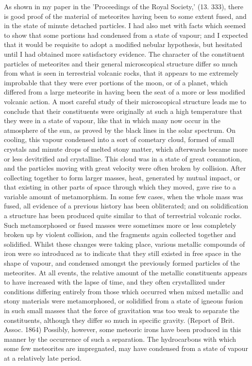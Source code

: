 \documentclass[a4paper, 12pt, oneside]{article}
\begin{document}
As shown in my paper in the 'Proceedings of the Royal Society,' (13. 333), there is good proof of the material of meteorites having been to some extent fused, and in the state of minute detached particles. I had also met with facts which seemed to show that some portions had condensed from a state of vapour; and I expected that it would be requisite to adopt a modified nebular hypothesis, but hesitated until I had obtained more satisfactory evidence. The character of the constituent particles of meteorites and their general microscopical structure differ so much from what is seen in terrestrial volcanic rocks, that it appears to me extremely improbable that they were ever portions of the moon, or of a planet, which differed from a large meteorite in having been the seat of a more or less modified volcanic action. A most careful study of their microscopical structure leads me to conclude that their constituents were originally at such a high temperature that they were in a state of vapour, like that in which many now occur in the atmosphere of the sun, as proved by the black lines in the solar spectrum. On cooling, this vapour condensed into a sort of cometary cloud, formed of small crystals and minute drops of melted stony matter, which afterwards became more or less devitrified and crystalline. This cloud was in a state of great commotion, and the particles moving with great velocity were often broken by collision. After collecting together to form larger masses, heat, generated by mutual impact, or that existing in other parts of space through which they moved, gave rise to a variable amount of metamorphism. In some few cases, when the whole mass was fused, all evidence of a previous history has been obliterated; and on solidification a structure has been produced quite similar to that of terrestrial volcanic rocks. Such metamorphosed or fused masses were sometimes more or less completely broken up by violent collision, and the fragments again collected together and solidified. Whilst these changes were taking place, various metallic compounds of iron were so introduced as to indicate that they still existed in free space in the shape of vapour, and condensed amongst the previously formed particles of the meteorites. At all events, the relative amount of the metallic constituents appears to have increased with the lapse of time, and they often crystallized under conditions differing entirely from those which occurred when mixed metallic and stony materials were metamorphosed, or solidified from a state of igneous fusion in such small masses that the force of gravitation was too weak to separate the constituents, although they differ so much in specific gravity. (Report of Brit. Assoc. 1864) Possibly, however, some meteoric irons have been produced in this manner by the occurrence of such a separation. The hydrocarbons with which some few meteorites are impregnated, may have condensed from a state of vapour at a relatively late period.
\end{document}

